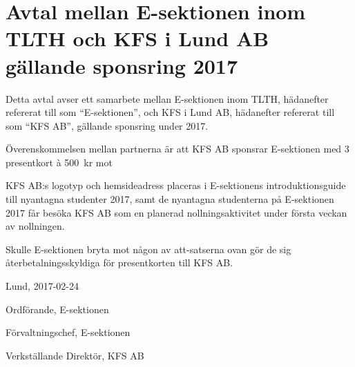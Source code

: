 \documentclass[10pt]{article}
\def\year{2017}
\def\doctitle{Avtal mellan E-sektionen inom TLTH och KFS i Lund AB gällande sponsring {\year}}
\def\date{2017-02-24} %
\begin{document}
    \section*{\doctitle}
    Detta avtal avser ett samarbete mellan E-sektionen inom TLTH, hädanefter refererat till som ``E-sektionen'', och KFS i Lund AB, hädanefter refererat till som ``KFS AB'', gällande sponsring under 2017.

    Överenskommelsen mellan partnerna är att KFS AB sponsrar E-sektionen med 3 presentkort \`{a} \SI{500}{kr} mot
    \begin{attsatser}
        \att KFS AB:s logotyp och hemsideadress placeras i E-sektionens introduktionsguide till nyantagna studenter 2017, samt
        \att de nyantagna studenterna på E-sektionen 2017 får besöka KFS AB som en planerad nollningsaktivitet under första veckan av nollningen.
    \end{attsatser}
    Skulle E-sektionen bryta mot någon av att-satserna ovan gör de sig återbetalningsskyldiga för presentkorten till KFS AB.

    \begin{signatures}{3}
        Lund, \date
        \signature{Erik Månsson}{Ordförande, E-sektionen}
        \signature{Sophia Grimmeiss Grahm}{Förvaltningschef, E-sektionen}
        \signature{Ingrid Lamberg}{Verkställande Direktör, KFS AB}
    \end{signatures}
\end{document}

